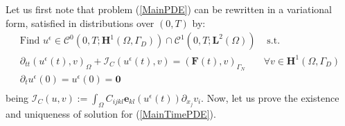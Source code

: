 Let us first note that problem (\ref{MainPDE}) can be rewritten in a variational form, satisfied in distributions over $(0,T)$ by: 
\begin{equation}
    \label{MainTimePDE}
    \begin{array}{cc}
        \text{Find } u^{\epsilon} \in \mathcal{C}^0 (0,T;\mathbf{H}^1(\Omega,\Gamma_D)) \cap \mathcal{C}^1(0,T;\mathbf{L}^2(\Omega)) & \text{ s.t. }\\
        \partial_{tt} (u^{\epsilon}(t),v)_{\Omega} + \mathcal{I}_{C}(u^{\epsilon}(t),v) = (\mathbf{F}(t),v)_{\Gamma_N}&  \forall v \in \mathbf{H}^1(\Omega,\Gamma_D) \\
        \partial_{t} u^{\epsilon}(0) = u^{\epsilon}(0) = \mathbf{0} & \\
    \end{array}
\end{equation}
being $\mathcal{I}_{C}(u,v) := \int_{\Omega} C_{ijkl}\mathbf{e}_{kl}(u^{\epsilon}(t)) \partial_{x_j} v_i$.
Now, let us prove the existence and uniqueness of solution for (\ref{MainTimePDE}).
